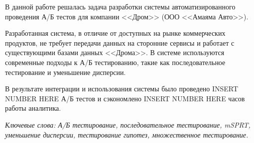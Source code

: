 \documentclass[../document.tex]{subfiles}
\begin{document}
	\par В данной работе решалась задача разработки системы автоматизированного проведения А/Б тестов для компании <<Дром>> (ООО <<Амаяма Авто>>).
	\par Разработанная система, в отличие от доступных на рынке коммерческих продуктов, не требует передачи данных на сторонние сервисы и работает с существующими базами данных <<Дрома>>. В системе используются современные подходы к А/Б тестированию, такие как последовательное тестирование и уменьшение дисперсии.
	\par В результате интеграции и использования системы было проведено INSERT NUMBER HERE А/Б тестов и сэкономлено INSERT NUMBER HERE часов работы аналитика.
	\par \textit{Ключевые слова: А/Б тестирование, последовательное тестирование, mSPRT, уменьшение дисперсии, тестирование гипотез, множественное тестирование.}
\end{document}
